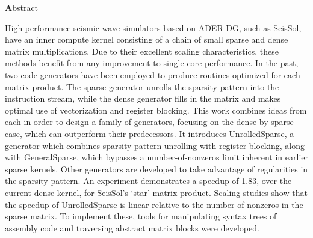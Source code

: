 
\clearemptydoublepage
{}
{}

\vspace*{2cm}
\begin{center}
{\Large \textbf Abstract}
\end{center}
\vspace{1cm}



High-performance seismic wave simulators based on ADER-DG, such as SeisSol, have an inner compute kernel consisting of a chain of small sparse and dense matrix multiplications. Due to their excellent scaling characteristics, these methods benefit from any improvement to single-core performance. In the past, two code generators have been employed to produce routines optimized for each matrix product. The sparse generator unrolls the sparsity pattern into the instruction stream, while the dense generator fills in the matrix and makes optimal use of vectorization and register blocking. This work combines ideas from each in order to design a family of generators, focusing on the dense-by-sparse case, which can outperform their predecessors. It introduces UnrolledSparse, a generator which combines sparsity pattern unrolling with register blocking, along with GeneralSparse, which bypasses a number-of-nonzeros limit inherent in earlier sparse kernels. Other generators are developed to take advantage of regularities in the sparsity pattern. An experiment demonstrates a speedup of 1.83, over the current dense kernel, for SeisSol's `star' matrix product. Scaling studies show that the speedup of UnrolledSparse is linear relative to the number of nonzeros in the sparse matrix. To implement these, tools for manipulating syntax trees of assembly code and traversing abstract matrix blocks were developed.

